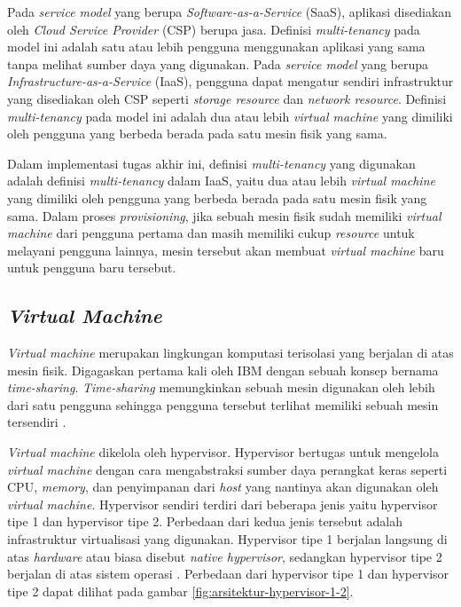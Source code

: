 Pada \emph{service model} yang berupa \emph{Software-as-a-Service} (SaaS), aplikasi
disediakan oleh \emph{Cloud Service Provider} (CSP) berupa jasa. Definisi \emph{multi-tenancy}
pada model ini adalah satu atau lebih pengguna menggunakan aplikasi yang sama tanpa melihat
sumber daya yang digunakan. Pada \emph{service model} yang berupa \emph{Infrastructure-as-a-Service} (IaaS), pengguna
dapat mengatur sendiri infrastruktur yang disediakan oleh CSP seperti \emph{storage resource} dan \emph{network resource}.
Definisi \emph{multi-tenancy} pada model ini adalah dua atau lebih \emph{virtual machine}
yang dimiliki oleh pengguna yang berbeda berada pada satu mesin fisik yang sama.

Dalam implementasi tugas akhir ini, definisi \emph{multi-tenancy} yang digunakan adalah definisi
\emph{multi-tenancy} dalam IaaS, yaitu dua atau lebih \emph{virtual machine} yang dimiliki oleh
pengguna yang berbeda berada pada satu mesin fisik yang sama. Dalam proses \emph{provisioning}, jika
sebuah mesin fisik sudah memiliki \emph{virtual machine} dari pengguna pertama dan
masih memiliki cukup \emph{resource} untuk melayani pengguna lainnya, mesin tersebut
akan membuat \emph{virtual machine} baru untuk pengguna baru tersebut.

\subsection{\emph{Virtual Machine}}
\label{sec:virtual-machine}

\emph{Virtual machine} merupakan lingkungan komputasi terisolasi
yang berjalan di atas mesin fisik. Digagaskan pertama kali oleh IBM
dengan sebuah konsep bernama \emph{time-sharing}. \emph{Time-sharing}
memungkinkan sebuah mesin digunakan oleh lebih dari satu pengguna sehingga
pengguna tersebut terlihat memiliki sebuah mesin tersendiri \parencite{ibm-website}.

\emph{Virtual machine} dikelola oleh hypervisor. Hypervisor bertugas untuk
mengelola \emph{virtual machine} dengan cara mengabstraksi sumber daya perangkat keras
seperti CPU, \emph{memory}, dan penyimpanan dari \emph{host} yang nantinya akan digunakan
oleh \emph{virtual machine}. Hypervisor sendiri terdiri dari beberapa jenis yaitu hypervisor tipe 1
dan hypervisor tipe 2. Perbedaan dari kedua jenis tersebut adalah infrastruktur virtualisasi yang digunakan.
Hypervisor tipe 1 berjalan langsung di atas \emph{hardware} atau biasa disebut \emph{native hypervisor},
sedangkan hypervisor tipe 2 berjalan di atas sistem operasi \parencite{Aalam_2021}. Perbedaan
dari hypervisor tipe 1 dan hypervisor tipe 2 dapat dilihat pada gambar \ref{fig:arsitektur-hypervisor-1-2}.

